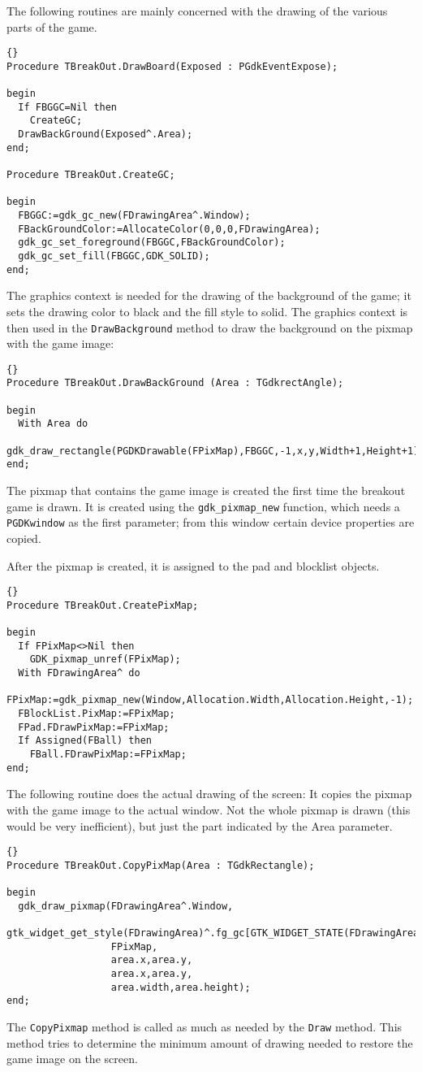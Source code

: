 \documentclass[10pt]{article}
\newcommand{\var}[1]{\texttt{#1}}
\begin{document}
The following routines are mainly concerned with the drawing of the various parts of the game.
\begin{lstlisting}{}
Procedure TBreakOut.DrawBoard(Exposed : PGdkEventExpose);

begin
  If FBGGC=Nil then
    CreateGC;  
  DrawBackGround(Exposed^.Area);
end;

Procedure TBreakOut.CreateGC;

begin
  FBGGC:=gdk_gc_new(FDrawingArea^.Window);
  FBackGroundColor:=AllocateColor(0,0,0,FDrawingArea);
  gdk_gc_set_foreground(FBGGC,FBackGroundColor);
  gdk_gc_set_fill(FBGGC,GDK_SOLID);
end;
\end{lstlisting}
The graphics context is needed for the drawing of the background of the game; 
it sets the drawing color to black and the fill style to solid. The graphics
context is then used in the \var{DrawBackground} method to draw the background
on the pixmap with the game image:
\begin{lstlisting}{}
Procedure TBreakOut.DrawBackGround (Area : TGdkrectAngle);

begin
  With Area do
    gdk_draw_rectangle(PGDKDrawable(FPixMap),FBGGC,-1,x,y,Width+1,Height+1);
end;
\end{lstlisting}
The pixmap that contains the game image is created the first time the breakout 
game is drawn. It is created using the \var{gdk\_pixmap\_new} function, which 
needs a \var{PGDKwindow} as the first parameter; from this window certain 
device properties are copied.

After the pixmap is created, it is assigned to the pad and blocklist objects.
\begin{lstlisting}{}
Procedure TBreakOut.CreatePixMap;

begin
  If FPixMap<>Nil then
    GDK_pixmap_unref(FPixMap);
  With FDrawingArea^ do
    FPixMap:=gdk_pixmap_new(Window,Allocation.Width,Allocation.Height,-1);
  FBlockList.PixMap:=FPixMap;
  FPad.FDrawPixMap:=FPixMap;
  If Assigned(FBall) then
    FBall.FDrawPixMap:=FPixMap;
end;
\end{lstlisting}
The following routine does the actual drawing of the screen: 
It copies the pixmap with the game image to the actual window. 
Not the whole pixmap is drawn (this would be very inefficient), 
but just the part indicated by the \var\var{Area} parameter.
\begin{lstlisting}{}
Procedure TBreakOut.CopyPixMap(Area : TGdkRectangle);

begin
  gdk_draw_pixmap(FDrawingArea^.Window,
                  gtk_widget_get_style(FDrawingArea)^.fg_gc[GTK_WIDGET_STATE(FDrawingArea)],
                  FPixMap,
                  area.x,area.y,
                  area.x,area.y,
                  area.width,area.height); 
end;
\end{lstlisting}
The \var{CopyPixmap} method is called as much as needed 
by the \var{Draw} method. This method tries to determine
the minimum amount of drawing needed to restore the game image on the screen.
\end{document}
